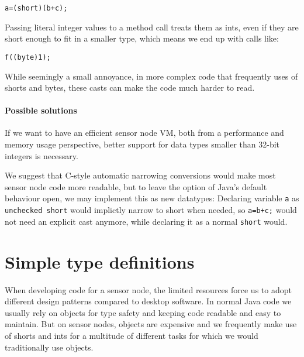 \texttt{a=(short)(b+c);}

Passing literal integer values to a method call treats them as ints, even if they are short enough to fit in a smaller type, which means we end up with calls like: 

\texttt{f((byte)1);}

While seemingly a small annoyance, in more complex code that frequently uses of shorts and bytes, these casts can make the code much harder to read.


\paragraph{Possible solutions}
If we want to have an efficient sensor node VM, both from a performance and memory usage perspective, better support for data types smaller than 32-bit integers is necessary.

We suggest that C-style automatic narrowing conversions would make most sensor node code more readable, but to leave the option of Java's default behaviour open, we may implement this as new datatypes: Declaring variable \texttt{a} as \texttt{unchecked short} would implictly narrow to short when needed, so \texttt{a=b+c;} would not need an explicit cast anymore, while declaring it as a normal \texttt{short} would.







\section{Simple type definitions}
\label{sec-typedef}
When developing code for a sensor node, the limited resources force us to adopt different design patterns compared to desktop software. In normal Java code we usually rely on objects for type safety and keeping code readable and easy to maintain. But on sensor nodes, objects are expensive and we frequently make use of shorts and ints for a multitude of different tasks for which we would traditionally use objects.

